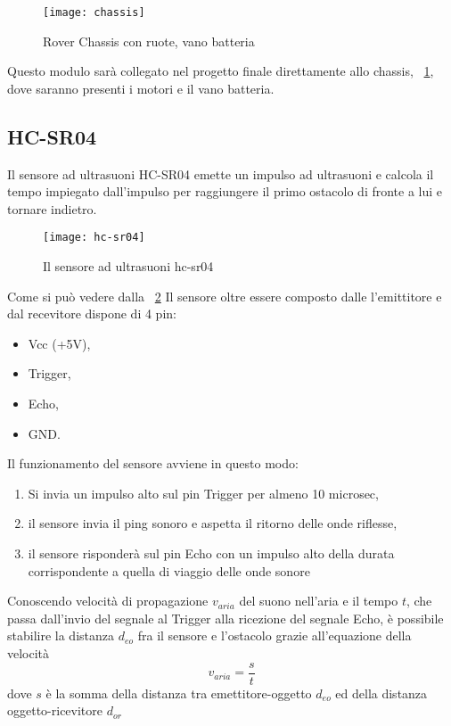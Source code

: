 \begin{figure}[htbp!] 
	\centering    
	\texttt{[image: chassis]}
	\caption[Rover Chassis]{Rover Chassis con ruote, vano batteria}
	\label{fig:chassis}
\end{figure}
Questo modulo sarà collegato nel progetto finale direttamente allo chassis, \figurename~\ref{fig:chassis}, dove saranno presenti i motori e il vano batteria.


\subsection{HC-SR04}


Il  sensore ad ultrasuoni HC-SR04 emette un impulso ad ultrasuoni e calcola il tempo impiegato dall’impulso per raggiungere il primo ostacolo di fronte a lui e tornare indietro.


\begin{figure}[htbp!] 
	\centering    
	\texttt{[image: hc-sr04]}
	\caption[HC-SR04]{Il sensore ad ultrasuoni hc-sr04}
	\label{fig:hc-sr04}
\end{figure}
Come si può vedere dalla \figurename~\ref{fig:hc-sr04} Il sensore oltre essere composto dalle l'emittitore e dal recevitore dispone di 4 pin:
\begin{itemize}
 \item Vcc (+5V), 
 \item Trigger, 
 \item Echo, 
 \item GND. 
\end{itemize}

Il funzionamento del sensore avviene in questo modo:
\begin{enumerate}
 \item Si invia un impulso alto sul pin Trigger per almeno 10 microsec,
 \item il sensore invia il ping sonoro e aspetta il ritorno delle onde riflesse,
 \item il sensore risponderà sul pin Echo con un impulso alto della durata corrispondente a quella di viaggio delle onde sonore
\end{enumerate}

Conoscendo velocità di propagazione $ v_{aria} $ del suono nell’aria e  il tempo $t$, che passa dall'invio del segnale al Trigger alla ricezione del segnale Echo, è possibile stabilire la distanza $d_{eo}$ fra il sensore e l’ostacolo  grazie all'equazione della velocità  \[v_{aria} = \dfrac{s}{t} \] dove $s$ è la somma della distanza tra emettitore-oggetto $d_{eo}$ ed della distanza oggetto-ricevitore $d_{or}$ 

